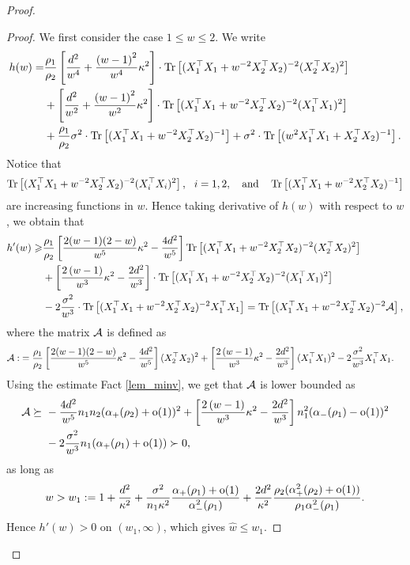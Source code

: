 \begin{proof}
\begin{proof}
We first consider the case $1\le w\le 2$. We write
\begin{align}
	h(w) =&  \frac{\rho_1}{\rho_2}\left[\frac{d^2}{w^4} +\frac{\left( w-1\right)^2}{w^4}\kappa^2\right]\cdot \tr\left[( X_1^{\top}X_1 +w^{-2}X_2^{\top}X_2)^{-2} (X_2^{\top}X_2)^2\right] \nonumber \\
	& + \left[\frac{d^2}{w^2} +\frac{\left( w-1\right)^2}{w^2}\kappa^2\right]\cdot \tr\left[( X_1^{\top}X_1 +w^{-2}X_2^{\top}X_2)^{-2} (X_1^{\top}X_1)^2\right] \nonumber\\
			& +  \frac{\rho_1}{\rho_2}\sigma^2  \cdot \bigtr{(X_1^{\top}X_1  + w^{-2}X_2^{\top}X_2)^{-1} }+ \sigma^2 \cdot \bigtr{(w^2X_1^{\top}X_1  + X_2^{\top}X_2)^{-1} }.\nonumber%
\end{align}
Notice that
$$\tr\left[( X_1^{\top}X_1 +w^{-2}X_2^{\top}X_2)^{-2} (X_i^{\top}X_i)^2\right],\ \ i=1,2, \quad \text{and} \quad \bigtr{(X_1^{\top}X_1  + w^{-2}X_2^{\top}X_2)^{-1} }$$
are increasing functions in $w$. Hence taking derivative of $h(w)$ with respect to $w$, we obtain that
\begin{align*}
h'(w) \ge & \frac{\rho_1}{\rho_2}\left[ \frac{2(w-1)(2-w)}{w^5}\kappa^2 - \frac{4d^2}{w^5}\right] \tr\left[( X_1^{\top}X_1 +w^{-2}X_2^{\top}X_2)^{-2} (X_2^{\top}X_2)^2\right]   \\
 &+ \left[\frac{2\left( w-1\right)}{w^3}\kappa^2 - \frac{2d^2}{w^3} \right]\cdot \tr\left[( X_1^{\top}X_1 +w^{-2}X_2^{\top}X_2)^{-2} (X_1^{\top}X_1)^2\right] \nonumber\\
		&- 2  \frac{\sigma^2}{w^3} \cdot \bigtr{(X_1^{\top}X_1 + w^{-2}X_2^{\top}X_2)^{-2} X_1^\top X_1  } =  \bigtr{(X_1^{\top}X_1 + w^{-2}X_2^{\top}X_2)^{-2} \cal A },
\end{align*}
where the matrix $\cal A$ is defined as 
\begin{align*}
\cal A :&= \frac{\rho_1}{\rho_2}\left[ \frac{2(w-1)(2-w)}{w^5}\kappa^2 - \frac{4d^2}{w^5}\right](X_2^{\top}X_2)^2 + \left[\frac{2\left( w-1\right)}{w^3}\kappa^2 - \frac{2d^2}{w^3} \right](X_1^{\top}X_1)^2 - 2 \frac{\sigma^2}{w^3}X_1^\top X_1.
\end{align*}
Using the estimate Fact \eqref{lem_minv}, we get that $\cal A$ is lower bounded as
\begin{align*}
\cal A \succeq&~ - \frac{4d^2}{w^5}n_1n_2 (\al_+(\rho_2)+\oo(1))^2 + \left[\frac{2\left( w-1\right)}{w^3}\kappa^2 - \frac{2d^2}{w^3} \right]n_1^2 (\al_-(\rho_1)-\oo(1))^2 \\
&~ - 2 \frac{\sigma^2}{w^3}n_1(\al_{+}(\rho_1)+\oo(1)) \succ 0,
\end{align*}
as long as
$$w> w_1:=1 +\frac{d^2}{\kappa^2}+ \frac{\sigma^2}{n_1\kappa^2}\frac{\al_{+}(\rho_1)+\oo(1)}{\al_{-}^2(\rho_1)} + \frac{2d^2}{\kappa^2}\frac{\rho_2(\al_+^2(\rho_2)+\oo(1))}{\rho_1\al_-^2(\rho_1) }.$$
Hence $h'(w)>0$ on $(w_1,\infty)$, %
which gives $\hat w\le w_1$.


\end{proof}
\end{proof}
